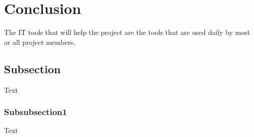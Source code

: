\section{Conclusion}\label{sec:conclusion}
The IT tools that will help the project are the tools that are used daily by most
or all project members.

\subsection{Subsection}
Text
\subsubsection{Subsubsection1}
Text\cite{*}
